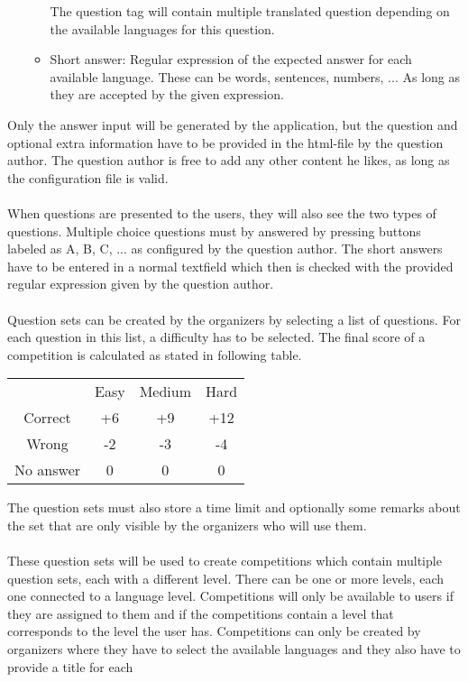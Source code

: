\begin{section}
\begin{itemize}
\begin{itemize}
  			The question tag will contain multiple translated question depending on the
  			available languages for this question.
  			\item Short answer: Regular expression of the expected answer for each
  			available language. These can be words, sentences, numbers, ... As long as
  			they are accepted by the given expression.
  		\end{itemize}
	\end{itemize}
	Only the answer input will be generated by the application, but the question and
	optional extra information have to be provided in the html-file by the question author.
	The question author is free to add any other content he likes, as long as the
	configuration file is valid. \\
	\\
	When questions are presented to the users, they will also see the two types of
	questions. Multiple choice questions must by answered by pressing buttons labeled as
	A, B, C, ... as configured by the question author. The short answers have to be
	entered in a normal textfield which then is checked with the provided regular
	expression given by the question author.\\
	\\
	Question sets can be created by the organizers by selecting a list of questions.
	For each question in this list, a difficulty has to be selected. The final score of a
	competition is calculated as stated in following table.
	\begin{tabular}{ c c c c }
	  & Easy & Medium & Hard \\
	  Correct & +6 & +9 & +12 \\
	  Wrong & -2 & -3 & -4 \\
	  No answer & 0 & 0 & 0 \\
	\end{tabular}
	The question sets must also store a time limit and optionally some remarks about the
	set that are only visible by the organizers who will use them. \\
	\\
	These question sets will be used to create competitions which contain multiple
	question sets, each with a different level. There can be one or more levels, each
	one connected to a language level. Competitions will only be available to users if
	they are assigned to them and if the competitions contain a level that corresponds to
	the level the user has. Competitions can only be created by organizers where they have
	to select the available languages and they also have to provide a title for each

\end{section}
